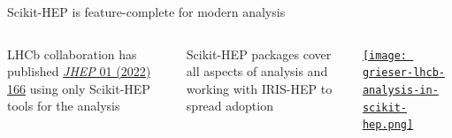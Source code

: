 \begin{frame}{Scikit-HEP is feature-complete for modern analysis}
\vspace{0.25 cm}
\begin{columns}

LHCb collaboration has published \href{https://inspirehep.net/literature/1889335}{\textit{JHEP} 01 (2022) 166} using only Scikit-HEP tools for the analysis

\vspace{0.75 cm}
Scikit-HEP packages cover all aspects of analysis and working with IRIS-HEP to spread adoption

\href{https://indico.cern.ch/event/1126109/contributions/4780169/}{\texttt{[image: grieser-lhcb-analysis-in-scikit-hep.png]}}
\end{columns}
\end{frame}
